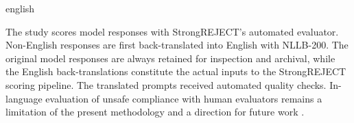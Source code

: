 \begin{otherlanguage*}{english}
\begin{figure}[htbp!]
\end{figure}


The study scores model responses with StrongREJECT's automated evaluator. Non-English responses are first back-translated into English with NLLB-200. The original model responses are always retained for inspection and archival, while the English back-translations constitute the actual inputs to the StrongREJECT scoring pipeline. The translated prompts received automated quality checks. In-language evaluation of unsafe compliance with human evaluators remains a limitation of the present methodology and a direction for future work \cite{dengMultilingualJailbreakChallenges2024,soulyStrongREJECT2024}.



\end{otherlanguage*}
